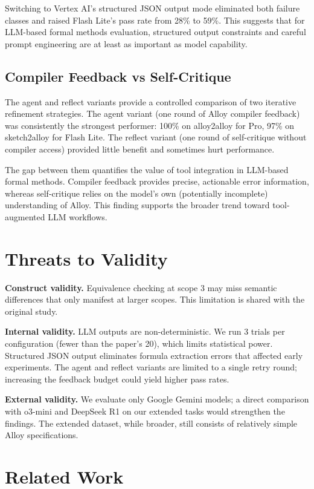 \documentclass[11pt]{article}
\begin{document}
Switching to Vertex AI's structured JSON output mode eliminated both failure classes and raised Flash Lite's pass rate from 28\% to 59\%. This suggests that for LLM-based formal methods evaluation, structured output constraints and careful prompt engineering are at least as important as model capability.

\subsection{Compiler Feedback vs Self-Critique}

The agent and reflect variants provide a controlled comparison of two iterative refinement strategies. The agent variant (one round of Alloy compiler feedback) was consistently the strongest performer: 100\% on alloy2alloy for Pro, 97\% on sketch2alloy for Flash Lite. The reflect variant (one round of self-critique without compiler access) provided little benefit and sometimes hurt performance.

The gap between them quantifies the value of tool integration in LLM-based formal methods. Compiler feedback provides precise, actionable error information, whereas self-critique relies on the model's own (potentially incomplete) understanding of Alloy. This finding supports the broader trend toward tool-augmented LLM workflows.

\section{Threats to Validity}

\textbf{Construct validity.} Equivalence checking at scope 3 may miss semantic differences that only manifest at larger scopes. This limitation is shared with the original study.

\textbf{Internal validity.} LLM outputs are non-deterministic. We run 3 trials per configuration (fewer than the paper's 20), which limits statistical power. Structured JSON output eliminates formula extraction errors that affected early experiments. The agent and reflect variants are limited to a single retry round; increasing the feedback budget could yield higher pass rates.

\textbf{External validity.} We evaluate only Google Gemini models; a direct comparison with o3-mini and DeepSeek R1 on our extended tasks would strengthen the findings. The extended dataset, while broader, still consists of relatively simple Alloy specifications.

\section{Related Work}
\end{document}
